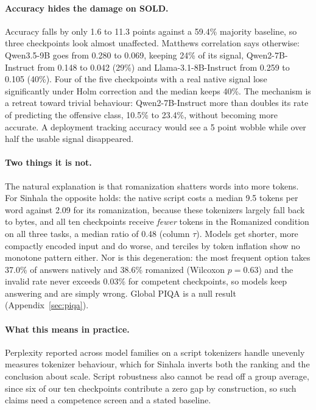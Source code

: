 \documentclass[11pt]{article}
\begin{document}
\paragraph{Accuracy hides the damage on SOLD.}
Accuracy falls by only 1.6 to 11.3 points against a 59.4\% majority baseline, so three
checkpoints look almost unaffected. Matthews correlation says otherwise: Qwen3.5-9B goes
from 0.280 to 0.069, keeping 24\% of its signal, Qwen2-7B-Instruct from 0.148 to 0.042
(29\%) and Llama-3.1-8B-Instruct from 0.259 to 0.105 (40\%). Four of the five checkpoints
with a real native signal lose significantly under Holm correction and the median keeps
40\%. The mechanism is a retreat toward trivial behaviour: Qwen2-7B-Instruct more than
doubles its rate of predicting the offensive class, 10.5\% to 23.4\%, without becoming
more accurate. A deployment tracking accuracy would see a 5 point wobble while over half
the usable signal disappeared.

\paragraph{Two things it is not.}
The natural explanation is that romanization shatters words into more tokens. For Sinhala
the opposite holds: the native script costs a median 9.5 tokens per word against 2.09 for
its romanization, because these tokenizers largely fall back to bytes, and all ten
checkpoints receive \emph{fewer} tokens in the Romanized condition on all three tasks, a
median ratio of 0.48 (column $\tau$). Models get shorter, more compactly encoded input and
do worse, and terciles by token inflation show no monotone pattern either. Nor is this
degeneration: the most frequent option takes 37.0\% of answers natively and 38.6\%
romanized (Wilcoxon $p = 0.63$) and the invalid rate never exceeds 0.03\% for competent
checkpoints, so models keep answering and are simply wrong. Global PIQA is a null result
(Appendix~\ref{sec:piqa}).

\paragraph{What this means in practice.}
Perplexity reported across model families on a script tokenizers handle unevenly measures
tokenizer behaviour, which for Sinhala inverts both the ranking and the conclusion about
scale. Script robustness also cannot be read off a group average, since six of our ten
checkpoints contribute a zero gap by construction, so such claims need a competence screen
and a stated baseline.
\end{document}
